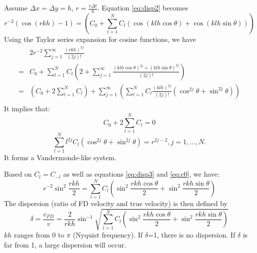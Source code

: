 Assume $\Delta x=\Delta y=h$, $r=\frac{v\Delta t}{h}$. Equation \eqref{eq:disp2} becomes
\begin{equation}\label{eq:disp3}
 r^{-2}( \cos (r kh)-1)
=\left(C_0+\sum_{l=1}^{N}C_l (\cos(klh\cos\theta)+\cos(klh\sin\theta))\right)
\end{equation}
Using the Taylor series expansion for cosine functions, we have
\begin{equation}
\begin{split}
 &2r^{-2}\sum_{j=1}^{\infty}\frac{(rkh)^{2j}}{(2j)!}\\
 =&C_0+\sum_{l=1}^{N}C_l \left(2+\sum_{j=1}^{\infty}\frac{(klh\cos\theta)^{2j}+(klh\sin\theta)^{2j}}{(2j)!}\right)\\
 =&\left(C_0+2\sum_{l=1}^{N}C_l\right)+
 \sum_{j=1}^{\infty} \left(\sum_{l=1}^{N}C_l\frac{(klh)^{2j}}{(2j)!}(\cos^{2j}\theta+\sin^{2j}\theta)\right)\\
\end{split}
\end{equation}
It implies that:
\begin{equation}\label{eq:c0}
 C_0+2\sum_{l=1}^{N}C_l=0
\end{equation}
\begin{equation}
 \sum_{l=1}^{N}l^{2j}C_l(\cos^{2j}\theta+\sin^{2j}\theta)=r^{2j-2}, j=1, \ldots, N.
\end{equation}
It forms a Vandermonde-like system.

Based on $C_l=C_{-l}$ as well as equations \eqref{eq:disp3} and \eqref{eq:c0}, we have:
\begin{equation}
 r^{-2}\sin^2\frac{rkh}{2}=\sum_{l=1}^N C_l \left(
 \sin^2\frac{rkh\cos\theta}{2}+\sin^2\frac{rkh\sin\theta}{2} \right)
\end{equation}
The dispersion (ratio of FD velocity and true velocity) is then defined by
\begin{equation}
 \delta=\frac{v_{FD}}{v}=\frac{2}{rkh}\sin^{-1}\sqrt{\sum_{l=1}^N C_l \left(
 \sin^2\frac{rkh\cos\theta}{2}+\sin^2\frac{rkh\sin\theta}{2} \right)}
\end{equation}
$kh$ ranges from 0 to $\pi$ (Nyquist frequency). If $\delta$=1, there is no dispersion. If $\delta$ is far from 1, a large dispersion will occur. 


